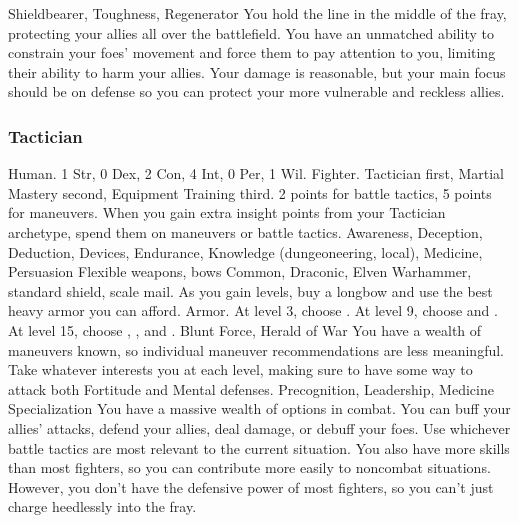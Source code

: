              Shieldbearer, Toughness, Regenerator
             You hold the line in the middle of the fray, protecting your allies all over the battlefield.
            You have an unmatched ability to constrain your foes' movement and force them to pay attention to you, limiting their ability to harm your allies.
            Your damage is reasonable, but your main focus should be on defense so you can protect your more vulnerable and reckless allies.

        \subsubsection{Tactician}
             Human.
             1 Str, 0 Dex, 2 Con, 4 Int, 0 Per, 1 Wil.
             Fighter.
             Tactician first, Martial Mastery second, Equipment Training third.
             2 points for battle tactics, 5 points for maneuvers.
                When you gain extra insight points from your Tactician archetype, spend them on maneuvers or battle tactics.
             Awareness, Deception, Deduction, Devices, Endurance, Knowledge (dungeoneering, local), Medicine, Persuasion
             Flexible weapons, bows
             Common, Draconic, Elven
             Warhammer, standard shield, scale mail. As you gain levels, buy a longbow and use the best heavy armor you can afford.
             Armor.
                At level 3, choose .
                At level 9, choose  and .
                At level 15, choose , , and .
             Blunt Force, Herald of War
            You have a wealth of maneuvers known, so individual maneuver recommendations are less meaningful.
            Take whatever interests you at each level, making sure to have some way to attack both Fortitude and Mental defenses.
             Precognition, Leadership, Medicine Specialization
             You have a massive wealth of options in combat.
            You can buff your allies' attacks, defend your allies, deal damage, or debuff your foes.
            Use whichever battle tactics are most relevant to the current situation.
            You also have more skills than most fighters, so you can contribute more easily to noncombat situations.
            However, you don't have the defensive power of most fighters, so you can't just charge heedlessly into the fray.

